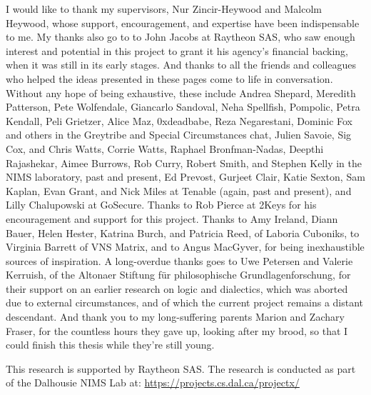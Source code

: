 \begin{acknowledgements}
I would like to thank my supervisors, Nur
Zincir-Heywood and Malcolm Heywood, whose support, encouragement, and expertise
have been indispensable to me. My thanks also go to to John Jacobs at Raytheon
SAS, who saw enough interest and potential in this project to grant it his
agency's financial backing, when it was still in its early stages. And thanks to
all the friends and colleagues who helped the ideas presented in these pages
come to life in conversation. Without any hope of being exhaustive, these
include Andrea Shepard, Meredith Patterson, Pete Wolfendale, Giancarlo Sandoval,
Neha Spellfish, Pompolic, Petra Kendall, Peli Grietzer, Alice Maz, 0xdeadbabe,
Reza Negarestani, Dominic Fox and others in the Greytribe and Special
Circumstances chat, Julien Savoie, Sig Cox, and Chris Watts, Corrie Watts,
Raphael Bronfman-Nadas, Deepthi Rajashekar, Aimee Burrows, Rob Curry, Robert
Smith, and Stephen Kelly in the NIMS laboratory, past and present, Ed Prevost,
Gurjeet Clair, Katie Sexton, Sam Kaplan, Evan Grant, and Nick Miles at Tenable
(again, past and present), and Lilly Chalupowski at GoSecure. Thanks to Rob
Pierce at 2Keys for his encouragement and support for this project. Thanks to Amy
Ireland, Diann Bauer, Helen Hester, Katrina Burch, and Patricia Reed, of Laboria
Cuboniks, to Virginia Barrett of VNS Matrix, and to Angus MacGyver, for being
inexhaustible sources of inspiration. A long-overdue thanks goes to Uwe Petersen
and Valerie Kerruish, of the Altonaer Stiftung für philosophische
Grundlagenforschung, for their support on an earlier research on logic and
dialectics, which was aborted due to external circumstances, and of which the
current project remains a distant descendant. And thank you to my long-suffering
parents Marion and Zachary Fraser, for the countless hours they gave up, looking
after my brood, so that I could finish this thesis while they're still young.

This research is supported by Raytheon SAS. The research is conducted
as part of the Dalhousie NIMS Lab at: \url{https://projects.cs.dal.ca/projectx/}
\end{acknowledgements}

\clearpage
\mainmatter